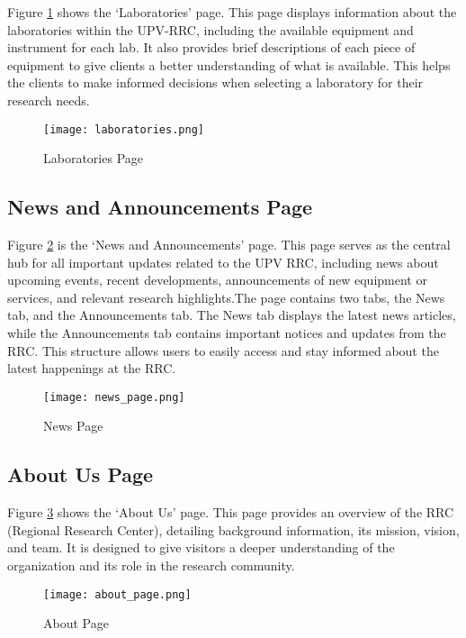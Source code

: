 Figure \ref{fig:laboratories_page} shows the `Laboratories' page. This page displays information about the laboratories within the UPV-RRC, including the available equipment and instrument for each lab. It also provides brief descriptions of each piece of equipment to give clients a better understanding of what is available. This helps the clients to make informed decisions when selecting a laboratory for their research needs. 

\begin{figure}[h]
	\centering
	\texttt{[image: laboratories.png]}
	\caption{Laboratories Page}
	\label{fig:laboratories_page}
\end{figure}

\newpage

\subsection{News and Announcements Page}

Figure \ref{fig:news_page} is the `News and Announcements' page. This page serves as the central hub for all important updates related to the UPV RRC, including news about upcoming events, recent developments, announcements of new equipment or services, and relevant research highlights.The page contains two tabs, the News tab, and the Announcements tab. The News tab displays the latest news articles, while the Announcements tab contains important notices and updates from the RRC. This structure allows users to easily access and stay informed about the latest happenings at the RRC.

\begin{figure}[h]
	\centering
	\texttt{[image: news\_page.png]}
	\caption{News Page}
	\label{fig:news_page}
\end{figure}

\newpage

\subsection{About Us Page} 

Figure \ref{fig:about_page} shows the `About Us' page. This page provides an overview of the RRC (Regional Research Center), detailing background information, its mission, vision, and team. It is designed to give visitors a deeper understanding of the organization and its role in the research community.

\begin{figure}[h]
	\centering
	\texttt{[image: about\_page.png]}
	\caption{About Page}
	\label{fig:about_page}
\end{figure}

